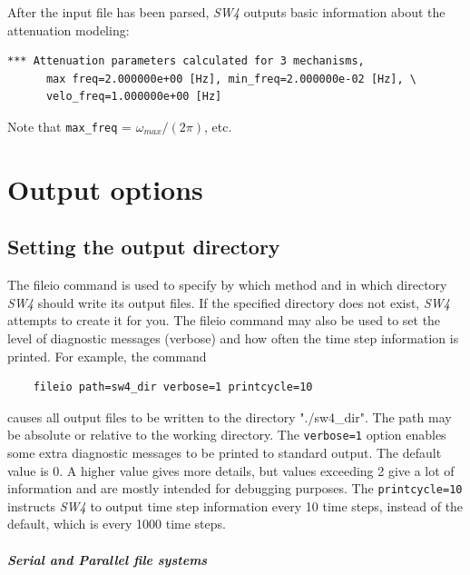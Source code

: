 \documentclass[11pt]{report}
\begin{document}
After the input file has been parsed, \emph{SW4} outputs basic information about the attenuation
modeling:
\begin{verbatim}
*** Attenuation parameters calculated for 3 mechanisms, 
      max freq=2.000000e+00 [Hz], min_freq=2.000000e-02 [Hz], \
      velo_freq=1.000000e+00 [Hz]
\end{verbatim}
Note that \verb+max_freq+ = $\omega_{max}/(2\pi)$, etc.

\chapter{Output options}
\section{Setting the output directory}\label{sec:output-dir}
The fileio command is used to specify by which method and in which directory \emph{SW4} should write
its output files.  If the specified directory does not exist, \emph{SW4} attempts to create it for you. The
fileio command may also be used to set the level of diagnostic messages (verbose) and how often the
time step information is printed. For example, the command
\begin{verbatim}
	fileio path=sw4_dir verbose=1 printcycle=10
\end{verbatim}
causes all output files to be written to the directory "./sw4\_dir". The path may be absolute or
relative to the working directory. The \verb+verbose=1+ option enables some extra diagnostic
messages to be printed to standard output. The default value is 0. A higher value gives more
details, but values exceeding 2 give a lot of information and are mostly intended for debugging
purposes. The \verb+printcycle=10+ instructs \emph{SW4} to output time step information every 10
time steps, instead of the default, which is every 1000 time steps.

\paragraph{Serial and Parallel file systems}
\end{document}
